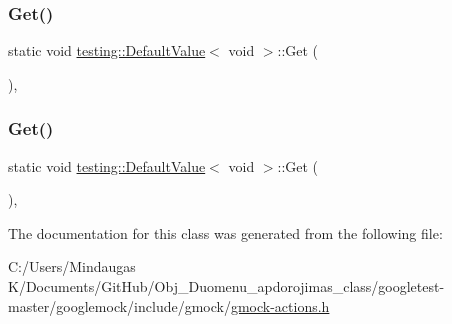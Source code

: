 \mbox{\label{classtesting_1_1_default_value_3_01void_01_4_acda4c367a5b0c0cfb28bc2289f385eed}} 
\subsubsection{\texorpdfstring{Get()}{Get()}\hspace{0.1cm}{\footnotesize\ttfamily [2/3]}}
{\footnotesize\ttfamily static void \mbox{\hyperlink{classtesting_1_1_default_value}{testing\+::\+Default\+Value}}$<$ void $>$\+::Get (\begin{DoxyParamCaption}{ }\end{DoxyParamCaption})\hspace{0.3cm}{\ttfamily [inline]}, {\ttfamily [static]}}

\mbox{\label{classtesting_1_1_default_value_3_01void_01_4_acda4c367a5b0c0cfb28bc2289f385eed}} 
\subsubsection{\texorpdfstring{Get()}{Get()}\hspace{0.1cm}{\footnotesize\ttfamily [3/3]}}
{\footnotesize\ttfamily static void \mbox{\hyperlink{classtesting_1_1_default_value}{testing\+::\+Default\+Value}}$<$ void $>$\+::Get (\begin{DoxyParamCaption}{ }\end{DoxyParamCaption})\hspace{0.3cm}{\ttfamily [inline]}, {\ttfamily [static]}}



The documentation for this class was generated from the following file\+:\begin{DoxyCompactItemize}
\item 
C\+:/\+Users/\+Mindaugas K/\+Documents/\+Git\+Hub/\+Obj\+\_\+\+Duomenu\+\_\+apdorojimas\+\_\+class/googletest-\/master/googlemock/include/gmock/\mbox{\hyperlink{googletest-master_2googlemock_2include_2gmock_2gmock-actions_8h}{gmock-\/actions.\+h}}\end{DoxyCompactItemize}
